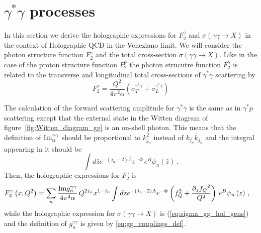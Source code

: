\documentclass[a4paper,12pt]{article}
\begin{document}
\section{$\gamma^{*} \gamma$ processes}

In this section we derive the holographic expressions for $F_2^\gamma$ and $\sigma\left(\gamma \gamma \rightarrow X\right)$ in the context of Holographic QCD in the Veneziano limit. We will consider the photon structure function $F^{\gamma}_2$ and the total cross-section $\sigma\left(\gamma \gamma \to X\right)$. Like in the case of the proton structure function $F_2^p$ the photon strucutre function $F_2^\gamma$ is related to the transverse and longitudinal total cross-sections of $\gamma^{*}\gamma$ scattering by
\begin{equation}
F_2^\gamma = \frac{Q^2}{4 \pi^2 \alpha} \left( \sigma_T^{\gamma^* \gamma} + \sigma_L^{\gamma^* \gamma} \right)
\end{equation}

The calculation of the forward scattering amplitude for $\gamma^{*}\gamma$ is the same as in $\gamma^{*} p$ scattering except that the external state in the Witten diagram of figure~\ref{fig:Witten_diagram_gg} is an on-shell photon. This means that the definition of $\rm{Im}^{\gamma \gamma}_n$ should be proportional to $k^2_{j_n}$ instead of $k_{j_n}\bar{k}_{j_n}$ and the integral appearing in it should be
\begin{equation}
\int d\bar{z} e^{-\left(j_n - 2 \right) \bar{A} } e^{-\Phi}  \, e^{\bar{B}} \psi_n\left(\bar{z}\right) \, .
\end{equation}
Then, the holographic expressions for $F_2^\gamma$ is
\begin{align}
&F^{\gamma}_2\left(x, Q^2\right) = \sum_n \frac{{\rm Im} g^{\gamma \gamma}_n}{4 \pi^2 \alpha} \, Q^{2 j_n} x^{1-j_n}  \int dz e^{-\left(j_n - 2 \right)A } e^{-\Phi} \left(f_Q^2 +\frac{\partial_z{f_Q}^2}{Q^2} \right) \, e^B \psi_n\left(z\right) \, \label{eq:hol_f2_gamma} ,
\end{align}
while the holographic expression for $\sigma\left(\gamma \gamma \to X\right)$ is (\ref{eq:sigma_gg_hol_gens}) and the definition of $g^{\gamma \gamma}_n$ is given by \ref{eq:gg_couplings_def}.
\end{document}
